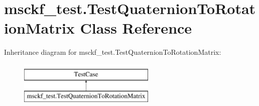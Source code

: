 \hypertarget{classmsckf__test_1_1_test_quaternion_to_rotation_matrix}{\section{msckf\-\_\-test.\-Test\-Quaternion\-To\-Rotation\-Matrix Class Reference}
\label{classmsckf__test_1_1_test_quaternion_to_rotation_matrix}
}
Inheritance diagram for msckf\-\_\-test.\-Test\-Quaternion\-To\-Rotation\-Matrix\-:\begin{figure}[H]
\begin{center}
\leavevmode
\includegraphics[height=2.000000cm]{classmsckf__test_1_1_test_quaternion_to_rotation_matrix}
\end{center}
\end{figure}
